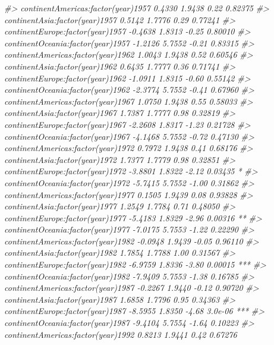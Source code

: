 \documentclass[
]{book}
\newenvironment{Shaded}{\begin{snugshade}}{\end{snugshade}}
\newcommand{\CommentTok}[1]{\textcolor[rgb]{0.56,0.35,0.01}{\textit{#1}}}
\begin{document}
\begin{Shaded}
\begin{Highlighting}[]
\CommentTok{#> continentAmericas:factor(year)1957   0.4330     1.9438    0.22  0.82375    }
\CommentTok{#> continentAsia:factor(year)1957       0.5142     1.7776    0.29  0.77241    }
\CommentTok{#> continentEurope:factor(year)1957    -0.4638     1.8313   -0.25  0.80010    }
\CommentTok{#> continentOceania:factor(year)1957   -1.2126     5.7552   -0.21  0.83315    }
\CommentTok{#> continentAmericas:factor(year)1962   1.0043     1.9438    0.52  0.60546    }
\CommentTok{#> continentAsia:factor(year)1962       0.6435     1.7777    0.36  0.71741    }
\CommentTok{#> continentEurope:factor(year)1962    -1.0911     1.8315   -0.60  0.55142    }
\CommentTok{#> continentOceania:factor(year)1962   -2.3774     5.7552   -0.41  0.67960    }
\CommentTok{#> continentAmericas:factor(year)1967   1.0750     1.9438    0.55  0.58033    }
\CommentTok{#> continentAsia:factor(year)1967       1.7387     1.7777    0.98  0.32819    }
\CommentTok{#> continentEurope:factor(year)1967    -2.2608     1.8317   -1.23  0.21728    }
\CommentTok{#> continentOceania:factor(year)1967   -4.1468     5.7552   -0.72  0.47130    }
\CommentTok{#> continentAmericas:factor(year)1972   0.7972     1.9438    0.41  0.68176    }
\CommentTok{#> continentAsia:factor(year)1972       1.7377     1.7779    0.98  0.32851    }
\CommentTok{#> continentEurope:factor(year)1972    -3.8801     1.8322   -2.12  0.03435 *  }
\CommentTok{#> continentOceania:factor(year)1972   -5.7415     5.7552   -1.00  0.31862    }
\CommentTok{#> continentAmericas:factor(year)1977   0.1505     1.9439    0.08  0.93828    }
\CommentTok{#> continentAsia:factor(year)1977       1.2549     1.7784    0.71  0.48050    }
\CommentTok{#> continentEurope:factor(year)1977    -5.4183     1.8329   -2.96  0.00316 ** }
\CommentTok{#> continentOceania:factor(year)1977   -7.0175     5.7553   -1.22  0.22290    }
\CommentTok{#> continentAmericas:factor(year)1982  -0.0948     1.9439   -0.05  0.96110    }
\CommentTok{#> continentAsia:factor(year)1982       1.7854     1.7788    1.00  0.31567    }
\CommentTok{#> continentEurope:factor(year)1982    -6.9759     1.8336   -3.80  0.00015 ***}
\CommentTok{#> continentOceania:factor(year)1982   -7.9409     5.7553   -1.38  0.16785    }
\CommentTok{#> continentAmericas:factor(year)1987  -0.2267     1.9440   -0.12  0.90720    }
\CommentTok{#> continentAsia:factor(year)1987       1.6858     1.7796    0.95  0.34363    }
\CommentTok{#> continentEurope:factor(year)1987    -8.5955     1.8350   -4.68  3.0e-06 ***}
\CommentTok{#> continentOceania:factor(year)1987   -9.4104     5.7554   -1.64  0.10223    }
\CommentTok{#> continentAmericas:factor(year)1992   0.8213     1.9441    0.42  0.67276    }

\end{Highlighting}
\end{Shaded}
\end{document}
